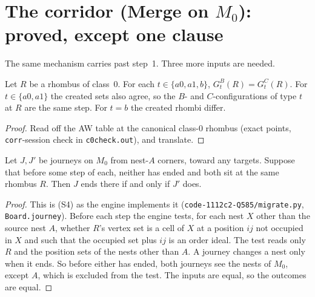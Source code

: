 \documentclass[11pt]{article}
\theoremstyle{definition}\newtheorem{definition}[theorem]{Definition}\newtheorem{remark}[theorem]{Remark}
\begin{document}
\section{The corridor (Merge on $M_0$): proved, except one clause}\label{sec:corr}
The same mechanism carries past step~1. Three more inputs are needed.
\begin{lemma}\label{lem:c0}
Let $R$ be a rhombus of class~0. For each $t\in\{a0,a1,b\}$, $G^B_t(R)=G^C_t(R)$. For $t\in\{a0,a1\}$ the created sets also agree, so the $B$- and $C$-configurations of type $t$ at $R$ are the same step. For $t=b$ the created rhombi differ.
\end{lemma}
\begin{proof}
Read off the AW table at the canonical class-0 rhombus (exact points, \texttt{corr}-session check in \texttt{c0check.out}), and translate.
\end{proof}
\begin{lemma}\label{lem:pack}
Let $J,J'$ be journeys on $M_0$ from nest-$A$ corners, toward any targets. Suppose that before some step of each, neither has ended and both sit at the same rhombus $R$. Then $J$ ends there if and only if $J'$ does.
\end{lemma}
\begin{proof}
This is (S4) as the engine implements it (\texttt{code-1112c2-Q585/migrate.py}, \texttt{Board.journey}). Before each step the engine tests, for each nest $X$ other than the source nest $A$, whether $R$'s vertex set is a cell of $X$ at a position $ij$ not occupied in $X$ and such that the occupied set plus $ij$ is an order ideal. The test reads only $R$ and the position sets of the nests other than $A$. A journey changes a nest only when it ends. So before either has ended, both journeys see the nests of $M_0$, except $A$, which is excluded from the test. The inputs are equal, so the outcomes are equal.
\end{proof}
\end{document}
